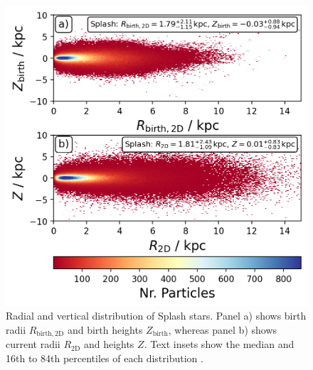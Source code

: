 \documentclass[fleqn,usenatbib]{mnras}
\begin{document}
\begin{figure}
    \centering
    \includegraphics[width=\columnwidth]{figures/splash_rz_birth_now.png}
    \caption{Radial and vertical distribution of Splash stars. Panel a) shows birth radii $R_\mathrm{birth, 2D}$ and birth heights $Z_\mathrm{birth}$, whereas panel b) shows current radii $R_\mathrm{2D}$ and heights $Z$. Text insets show the median and 16th to 84th percentiles of each distribution
    \href{https://github.com/svenbuder/gse_nihaouhd/tree/main/figures}{\faGithub}.}
    \label{fig:splash_rz_birth_now}
\end{figure}
\end{document}
